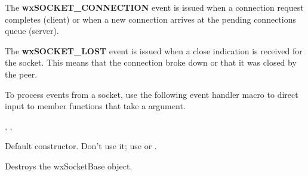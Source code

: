 The {\bf wxSOCKET\_CONNECTION} event is issued when a connection request
completes (client) or when a new connection arrives at the pending
connections queue (server).

The {\bf wxSOCKET\_LOST} event is issued when a close indication is
received for the socket. This means that the connection broke down or
that it was closed by the peer.


To process events from a socket, use the following event handler macro to direct
input to member functions that take a  argument.

\twocolwidtha{7cm}%
\begin{twocollist}\itemsep=0pt
\end{twocollist}%


, 
, 




Default constructor. Don't use it; use  
or .



Destroys the wxSocketBase object.


%
%

